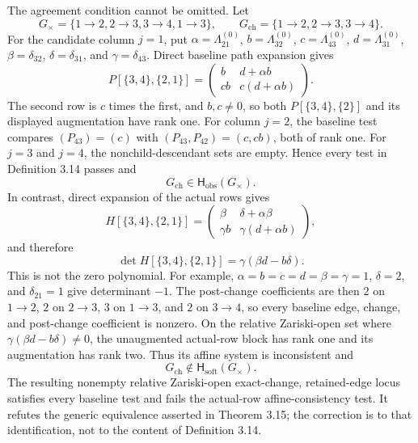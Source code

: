 The agreement condition cannot be omitted.  Let
\[
 G_\times=\{1\to2,2\to3,3\to4,1\to3\},
 \qquad
 G_{\mathrm{ch}}=\{1\to2,2\to3,3\to4\}.
\]
For the candidate column \(j=1\), put \(\alpha=\Lambda^{(0)}_{21}\), \(b=\Lambda^{(0)}_{32}\), \(c=\Lambda^{(0)}_{43}\), \(d=\Lambda^{(0)}_{31}\), \(\beta=\delta_{32}\), \(\delta=\delta_{31}\), and \(\gamma=\delta_{43}\).  Direct baseline path expansion gives
\[
 P[\{3,4\},\{2,1\}]
 =\begin{pmatrix}
 b&d+\alpha b\\
 cb&c(d+\alpha b)
 \end{pmatrix}.
\]
The second row is \(c\) times the first, and \(b,c\ne0\), so both \(P[\{3,4\},\{2\}]\) and its displayed augmentation have rank one.  For column \(j=2\), the baseline test compares \((P_{43})=(c)\) with \((P_{43},P_{42})=(c,cb)\), both of rank one.  For \(j=3\) and \(j=4\), the nonchild-descendant sets are empty.  Hence every test in Definition 3.14 passes and
\[
 G_{\mathrm{ch}}\in\mathsf H_{\mathrm{obs}}(G_\times).
\]
In contrast, direct expansion of the actual rows gives
\[
 H[\{3,4\},\{2,1\}]
 =\begin{pmatrix}
 \beta&\delta+\alpha\beta\\
 \gamma b&\gamma(d+\alpha b)
 \end{pmatrix},
\]
and therefore
\[
 \det H[\{3,4\},\{2,1\}]
 =\gamma(\beta d-b\delta).
\]
This is not the zero polynomial.  For example, \(\alpha=b=c=d=\beta=\gamma=1\), \(\delta=2\), and \(\delta_{21}=1\) give determinant \(-1\).  The post-change coefficients are then \(2\) on \(1\to2\), \(2\) on \(2\to3\), \(3\) on \(1\to3\), and \(2\) on \(3\to4\), so every baseline edge, change, and post-change coefficient is nonzero.  On the relative Zariski-open set where \(\gamma(\beta d-b\delta)\ne0\), the unaugmented actual-row block has rank one and its augmentation has rank two.  Thus its affine system is inconsistent and
\[
 G_{\mathrm{ch}}\notin\mathsf H_{\mathrm{soft}}(G_\times).
\]
The resulting nonempty relative Zariski-open exact-change, retained-edge locus satisfies every baseline test and fails the actual-row affine-consistency test.  It refutes the generic equivalence asserted in Theorem 3.15; the correction is to that identification, not to the content of Definition 3.14.

